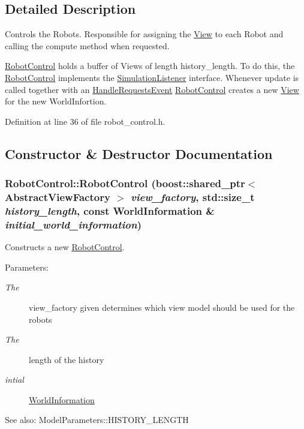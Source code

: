 \subsection{Detailed Description}
Controls the Robots. Responsible for assigning the \hyperlink{class_view}{View} to each Robot and calling the compute method when requested.

\hyperlink{class_robot_control}{RobotControl} holds a buffer of Views of length history\_\-length. To do this, the \hyperlink{class_robot_control}{RobotControl} implements the \hyperlink{class_simulation_listener}{SimulationListener} interface. Whenever update is called together with an \hyperlink{class_handle_requests_event}{HandleRequestsEvent} \hyperlink{class_robot_control}{RobotControl} creates a new \hyperlink{class_view}{View} for the new WorldInfortion. 

Definition at line 36 of file robot\_\-control.h.

\subsection{Constructor \& Destructor Documentation}
\hypertarget{class_robot_control_2f44ebe0a98fff131117c10b3594381f}{
\subsubsection[RobotControl]{\setlength{\rightskip}{0pt plus 5cm}RobotControl::RobotControl (boost::shared\_\-ptr$<$ AbstractViewFactory $>$ {\em view\_\-factory}, \/  std::size\_\-t {\em history\_\-length}, \/  const {\bf WorldInformation} \& {\em initial\_\-world\_\-information})}}
\label{class_robot_control_2f44ebe0a98fff131117c10b3594381f}


Constructs a new \hyperlink{class_robot_control}{RobotControl}. \begin{Desc}
\item[Parameters:]
\begin{description}
\item[{\em The}]view\_\-factory given determines which view model should be used for the robots \item[{\em The}]length of the history \item[{\em intial}]\hyperlink{class_world_information}{WorldInformation} \end{description}
\end{Desc}
\begin{Desc}
\item[See also:]ModelParameters::HISTORY\_\-LENGTH \end{Desc}


